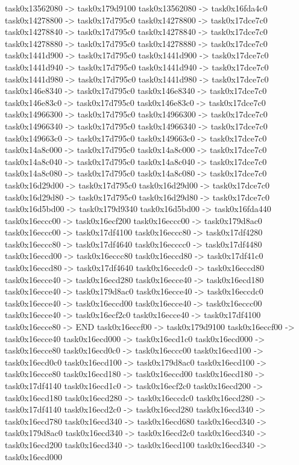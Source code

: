 {	task0x13562080 -> task0x179d9100
	task0x13562080 -> task0x16fda4c0
	task0x14278800 -> task0x17d795c0
	task0x14278800 -> task0x17dce7c0
	task0x14278840 -> task0x17d795c0
	task0x14278840 -> task0x17dce7c0
	task0x14278880 -> task0x17d795c0
	task0x14278880 -> task0x17dce7c0
	task0x1441d900 -> task0x17d795c0
	task0x1441d900 -> task0x17dce7c0
	task0x1441d940 -> task0x17d795c0
	task0x1441d940 -> task0x17dce7c0
	task0x1441d980 -> task0x17d795c0
	task0x1441d980 -> task0x17dce7c0
	task0x146e8340 -> task0x17d795c0
	task0x146e8340 -> task0x17dce7c0
	task0x146e83c0 -> task0x17d795c0
	task0x146e83c0 -> task0x17dce7c0
	task0x14966300 -> task0x17d795c0
	task0x14966300 -> task0x17dce7c0
	task0x14966340 -> task0x17d795c0
	task0x14966340 -> task0x17dce7c0
	task0x149663c0 -> task0x17d795c0
	task0x149663c0 -> task0x17dce7c0
	task0x14a8c000 -> task0x17d795c0
	task0x14a8c000 -> task0x17dce7c0
	task0x14a8c040 -> task0x17d795c0
	task0x14a8c040 -> task0x17dce7c0
	task0x14a8c080 -> task0x17d795c0
	task0x14a8c080 -> task0x17dce7c0
	task0x16d29d00 -> task0x17d795c0
	task0x16d29d00 -> task0x17dce7c0
	task0x16d29d80 -> task0x17d795c0
	task0x16d29d80 -> task0x17dce7c0
	task0x16d5bd00 -> task0x179d9340
	task0x16d5bd00 -> task0x16fda440
	task0x16eccc00 -> task0x16ecf200
	task0x16eccc00 -> task0x179d8ac0
	task0x16eccc00 -> task0x17df4100
	task0x16eccc80 -> task0x17df4280
	task0x16eccc80 -> task0x17df4640
	task0x16ecccc0 -> task0x17df4480
	task0x16eccd00 -> task0x16eccc80
	task0x16eccd80 -> task0x17df41c0
	task0x16eccd80 -> task0x17df4640
	task0x16eccdc0 -> task0x16eccd80
	task0x16ecce40 -> task0x16ecd280
	task0x16ecce40 -> task0x16ecd180
	task0x16ecce40 -> task0x179d8ac0
	task0x16ecce40 -> task0x16eccdc0
	task0x16ecce40 -> task0x16eccd00
	task0x16ecce40 -> task0x16eccc00
	task0x16ecce40 -> task0x16ecf2c0
	task0x16ecce40 -> task0x17df4100
	task0x16ecce80 -> END
	task0x16eccf00 -> task0x179d9100
	task0x16eccf00 -> task0x16ecce40
	task0x16ecd000 -> task0x16ecd1c0
	task0x16ecd000 -> task0x16ecce80
	task0x16ecd0c0 -> task0x16eccc00
	task0x16ecd100 -> task0x16ecd0c0
	task0x16ecd100 -> task0x179d8ac0
	task0x16ecd100 -> task0x16ecce80
	task0x16ecd180 -> task0x16eccd00
	task0x16ecd180 -> task0x17df4140
	task0x16ecd1c0 -> task0x16ecf2c0
	task0x16ecd200 -> task0x16ecd180
	task0x16ecd280 -> task0x16eccdc0
	task0x16ecd280 -> task0x17df4140
	task0x16ecd2c0 -> task0x16ecd280
	task0x16ecd340 -> task0x16ecd780
	task0x16ecd340 -> task0x16ecd680
	task0x16ecd340 -> task0x179d8ac0
	task0x16ecd340 -> task0x16ecd2c0
	task0x16ecd340 -> task0x16ecd200
	task0x16ecd340 -> task0x16ecd100
	task0x16ecd340 -> task0x16ecd000
}
